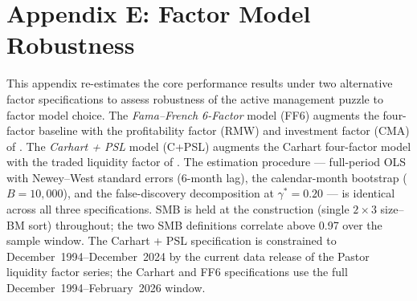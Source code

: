 \documentclass[12pt]{article}
\begin{document}







\clearpage
\section*{Appendix E: Factor Model Robustness}
\label{app:factor_robust}
\setcounter{table}{0}
\renewcommand{\thetable}{E.\arabic{table}}
\setcounter{figure}{0}
\renewcommand{\thefigure}{E.\arabic{figure}}

This appendix re-estimates the core performance results under two alternative
factor specifications to assess robustness of the active management puzzle to
factor model choice. The \textit{Fama--French 6-Factor} model (FF6) augments
the \textcite{Carhart1997} four-factor baseline with the profitability factor
(RMW) and investment factor (CMA) of \textcite{FamaFrench2015}. The
\textit{Carhart + PSL} model (C+PSL) augments the Carhart four-factor model
with the traded liquidity factor of \textcite{PastorStambaugh2003}. The
estimation procedure --- full-period OLS with Newey--West standard errors
(6-month lag), the \textcite{FamaFrench2010} calendar-month bootstrap
($B = 10{,}000$), and the \textcite{BarrasScailletWermers2010} false-discovery
decomposition at $\gamma^{*} = 0.20$ --- is identical across all three
specifications. SMB is held at the \textcite{FamaFrench1993} construction
(single $2 \times 3$ size--BM sort) throughout; the two SMB definitions
correlate above 0.97 over the sample window. The Carhart + PSL specification
is constrained to December~1994--December~2024 by the current data release
of the Pastor liquidity factor series; the Carhart and FF6 specifications
use the full December~1994--February~2026 window.


\clearpage


\clearpage


\clearpage

\clearpage
\printbibliography
\end{document}
